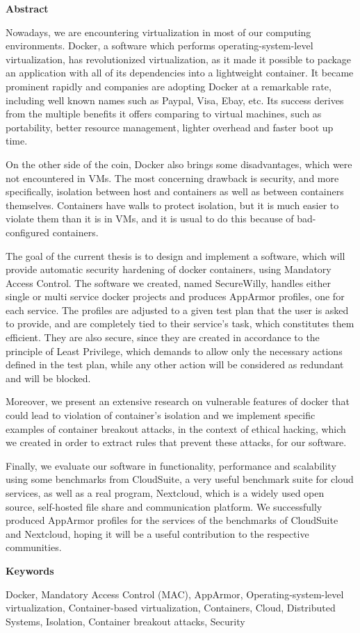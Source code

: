 \hfill\break
\begingroup
\Large{\textbf{Abstract}}
\endgroup
\hfill\break

Nowadays, we are encountering virtualization in most of our computing environments. Docker, a software which performs operating-system-level virtualization, has revolutionized virtualization, as it made it possible to package an application with all of its dependencies into a lightweight container. It became prominent rapidly and companies are adopting Docker at a remarkable rate, including well known names such as Paypal, Visa, Ebay, etc. Its success derives from the multiple benefits it offers comparing to virtual machines, such as portability, better resource management, lighter overhead and faster boot up time. 

On the other side of the coin, Docker also brings some disadvantages, which were not encountered in VMs. The most concerning drawback is security, and more specifically, isolation between host and containers as well as between containers themselves. Containers have walls to protect isolation, but it is much easier to violate them than it is in VMs, and it is usual to do this because of bad-configured containers.

The goal of the current thesis is to design and implement a software, which will provide automatic security hardening of docker containers, using Mandatory Access Control. The software we created, named SecureWilly, handles either single or multi service docker projects and produces AppArmor profiles, one for each service. The profiles are adjusted to a given test plan that the user is asked to provide, and are completely tied to their service's task, which constitutes them efficient. They are also secure, since they are created in accordance to the principle of Least Privilege, which demands to allow only the necessary actions defined in the test plan, while any other action will be considered as redundant and will be blocked.

Moreover, we present an extensive research on vulnerable features of docker that could lead to violation of container's isolation and we implement specific examples of container breakout attacks, in the context of ethical hacking, which we created in order to extract rules that prevent these attacks, for our software.

Finally, we evaluate our software in functionality, performance and scalability using some benchmarks from CloudSuite, a very useful benchmark suite for cloud services, as well as a real program, Nextcloud, which is a widely used open source, self-hosted file share and communication platform. We successfully produced AppArmor profiles for the services of the benchmarks of CloudSuite and Nextcloud, hoping it will be a useful contribution to the respective communities.

\hfill\break
\begingroup
\Large{\textbf{Keywords}}
\endgroup

\hfill\break
Docker, Mandatory Access Control (MAC), AppArmor, Operating-system-level virtualization, Container-based virtualization, Containers, Cloud, Distributed Systems, Isolation, Container breakout attacks, Security

\clearpage\null\thispagestyle{empty}
\newpage
